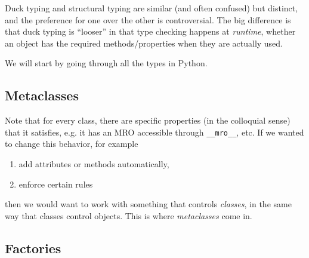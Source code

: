   Duck typing and structural typing are similar (and often confused) but distinct, and the preference for one over the other is controversial. The big difference is that duck typing is ``looser'' in that type checking happens at \textit{runtime}, whether an object has the required methods/properties when they are actually used. 

  We will start by going through all the types in Python. 

\subsection{Metaclasses} 

  Note that for every class, there are specific properties (in the colloquial sense) that it satisfies, e.g. it has an MRO accessible through \texttt{\_\_mro\_\_}, etc. If we wanted to change this behavior, for example 
  \begin{enumerate}
    \item add attributes or methods automatically, 
    \item enforce certain rules 
  \end{enumerate}
  then we would want to work with something that controls \textit{classes}, in the same way that classes control objects. This is where \textit{metaclasses} come in. 


\subsection{Factories}

